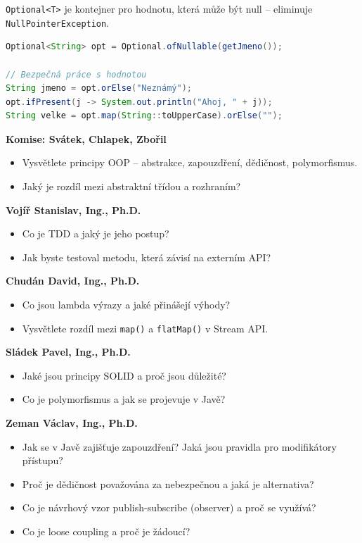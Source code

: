 \texttt{Optional<T>} je kontejner pro hodnotu, která může být null -- eliminuje \texttt{NullPointerException}.

\begin{lstlisting}[language=Java, caption=Optional v Javě]
Optional<String> opt = Optional.ofNullable(getJmeno());

// Bezpečná práce s hodnotou
String jmeno = opt.orElse("Neznámý");
opt.ifPresent(j -> System.out.println("Ahoj, " + j));
String velke = opt.map(String::toUpperCase).orElse("");
\end{lstlisting}

\begin{profesorbox}
\textbf{Komise: Svátek, Chlapek, Zbořil}
\begin{itemize}
  \item Vysvětlete principy OOP -- abstrakce, zapouzdření, dědičnost, polymorfismus.
  \item Jaký je rozdíl mezi abstraktní třídou a rozhraním?
\end{itemize}
\textbf{Vojíř Stanislav, Ing., Ph.D.}
\begin{itemize}
  \item Co je TDD a jaký je jeho postup?
  \item Jak byste testoval metodu, která závisí na externím API?
\end{itemize}
\textbf{Chudán David, Ing., Ph.D.}
\begin{itemize}
  \item Co jsou lambda výrazy a jaké přinášejí výhody?
  \item Vysvětlete rozdíl mezi \texttt{map()} a \texttt{flatMap()} v Stream API.
\end{itemize}
\textbf{Sládek Pavel, Ing., Ph.D.}
\begin{itemize}
  \item Jaké jsou principy SOLID a proč jsou důležité?
  \item Co je polymorfismus a jak se projevuje v Javě?
\end{itemize}
\textbf{Zeman Václav, Ing., Ph.D.}
\begin{itemize}
  \item Jak se v Javě zajišťuje zapouzdření? Jaká jsou pravidla pro modifikátory přístupu?
  \item Proč je dědičnost považována za nebezpečnou a jaká je alternativa?
  \item Co je návrhový vzor publish-subscribe (observer) a proč se využívá?
  \item Co je loose coupling a proč je žádoucí?

\end{itemize}
\end{profesorbox}
